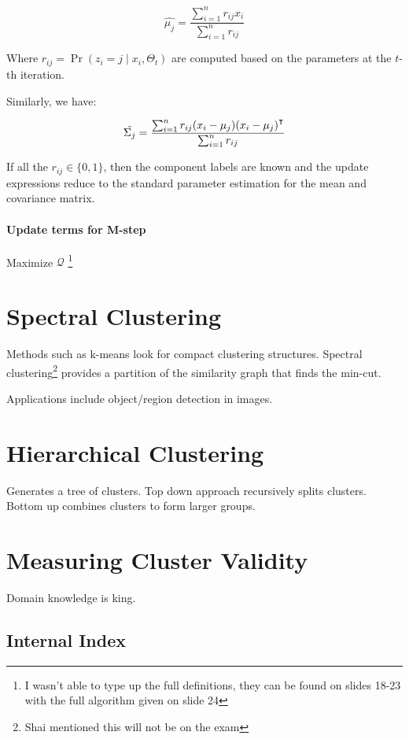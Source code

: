 \documentclass{idc_msc}
\renewcommand{\T}{{\mathpalette\raiseT\intercal}} %
\begin{document}
\[\hat{\mu_j} = \frac{\sum_{i=1}^n r_{ij} x_i}{\sum_{i=1}^n r_{ij}}\]

Where \(r_{ij} = \Pr(z_i = j \mid x_i, \Theta_t)\) are computed based on the parameters at the \(t\)-th iteration.

Similarly, we have:

\[\hat{\Sigma_j} = \frac{\sum_{i=1}^n r_{ij} (x_i - \mu_j)(x_i - \mu_j)^\T}{\sum_{i=1}^n r_{ij}}\]

If all the \(r_{ij} \in \{0,1\}\), then the component labels are known and the update expressions reduce to the standard parameter estimation for the mean and covariance matrix.

\paragraph{Update terms for M-step}

Maximize \(\mathcal{Q}\)
\footnote{I wasn't able to type up the full definitions, they can be found on slides 18-23 with the full algorithm given on slide 24}


\section{Spectral Clustering}

Methods such as k-means look for compact clustering structures.
Spectral clustering\footnote{Shai mentioned this will not be on the exam} provides a partition of the similarity graph that finds the min-cut.

Applications include object/region detection in images.

\section{Hierarchical Clustering}

Generates a tree of clusters. Top down approach recursively splits clusters. Bottom up combines clusters to form larger groups.

\section{Measuring Cluster Validity}

Domain knowledge is king.

\subsection{Internal Index}
\end{document}
